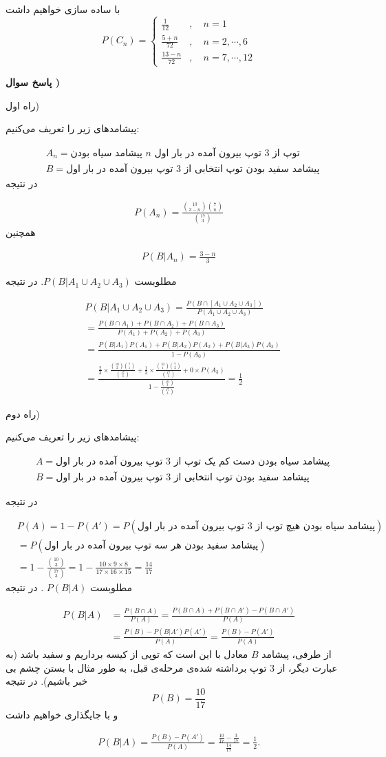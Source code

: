 \documentclass[10pt,letterpaper]{report}
\newcounter{questionanswernumber}
\newcommand{\QA}{
\textbf{پاسخ سوال \thequestionanswernumber)}
\stepcounter{questionanswernumber}
}
\newcommand{\eqn}[1]{
\[\begin{split}
#1
\end{split}\]
}
\begin{document}
با ساده سازی خواهیم داشت
$$
P(C_n)=
\begin{cases}
\frac{1}{12}&,\quad n=1\\
\frac{5+n}{72}&,\quad n=2,\cdots,6\\
\frac{13-n}{72}&,\quad n=7,\cdots,12
\end{cases}
$$
\QA

راه اول)

پیشامدهای زیر را تعریف می‌کنیم:
\eqn{
&
A_n=\text{
پیشامد سیاه بودن $n$ توپ از 3 توپ بیرون آمده در بار اول
}
\\&
B=\text{
پیشامد سفید بودن توپ انتخابی از 3 توپ بیرون آمده در بار اول
}
}{}
در نتیجه
\eqn{
P(A_n)=\frac{\binom{10}{3-n}\binom{7}{n}}{\binom{17}{3}}
}{}
همچنین
\eqn{
P(B|A_n)=\frac{3-n}{3}
}{}

مطلوبست
$
P(B|A_1\cup A_2\cup A_3)
$.
در نتیجه
\eqn{
&
P(B|A_1\cup A_2\cup A_3)
=
\frac{
P(B\cap[A_1\cup A_2\cup A_3])
}{
P(A_1\cup A_2\cup A_3)
}
\\&=
\frac{
P(B\cap A_1)+P(B\cap A_2)+P(B\cap A_3)
}{
P(A_1)+P(A_2)+P(A_3)
}
\\&=
\frac{
P(B|A_1)P(A_1)+P(B|A_2)P(A_2)+P(B|A_3)P(A_3)
}{
1-P(A_0)
}
\\&=
\frac{
\frac{2}{3}\times \frac{\binom{10}{2}\binom{7}{1}}{\binom{17}{3}}+
\frac{1}{3}\times \frac{\binom{10}{1}\binom{7}{2}}{\binom{17}{3}}+0\times P(A_3)
}{
1-\frac{\binom{10}{3}}{\binom{17}{3}}
}
=\frac{1}{2}
}{}

راه دوم)

پیشامدهای زیر را تعریف می‌کنیم:
\eqn{
&
A=\text{
پیشامد سیاه بودن دست کم یک توپ از 3 توپ بیرون آمده در بار اول
}
\\&
B=\text{
پیشامد سفید بودن توپ انتخابی از 3 توپ بیرون آمده در بار اول
}
}{}

در نتیجه
\eqn{
&P(A)=1-P(A')=P(\text{
پیشامد سیاه بودن هیچ توپ از 3 توپ بیرون آمده در بار اول
})
\\&=
P(\text{
پیشامد سفید بودن هر سه توپ بیرون آمده در بار اول
})
\\&=
1-\frac{\binom{10}{3}}{\binom{17}{3}}
=
1-\frac{10\times 9\times 8}{17\times 16\times 15}
=
\frac{14}{17}
}{}
مطلوبست
$
P(B|A)
$
. در نتیجه
\eqn{
P(B|A)&=\frac{P(B\cap A)}{P(A)}
=\frac{P(B\cap A)+P(B\cap A')-P(B\cap A')}{P(A)}
\\&=\frac{P(B)-P(B|A')P(A')}{P(A)}
=\frac{P(B)-P(A')}{P(A)}
}{}
از طرفی، پیشامد $B$ معادل با این است که توپی از کیسه برداریم و سفید باشد (به عبارت دیگر، از 3 توپ برداشته شده‌ی مرحله‌ی قبل، به طور مثال با بستن چشم بی خبر باشیم). در نتیجه
$$
P(B)=\frac{10}{17}
$$
و با جایگذاری خواهیم داشت
\eqn{
P(B|A)=\frac{P(B)-P(A')}{P(A)}
=\frac{\frac{10}{17}-\frac{3}{17}}{\frac{14}{17}}=\frac{1}{2}.
}{}
\end{document}
